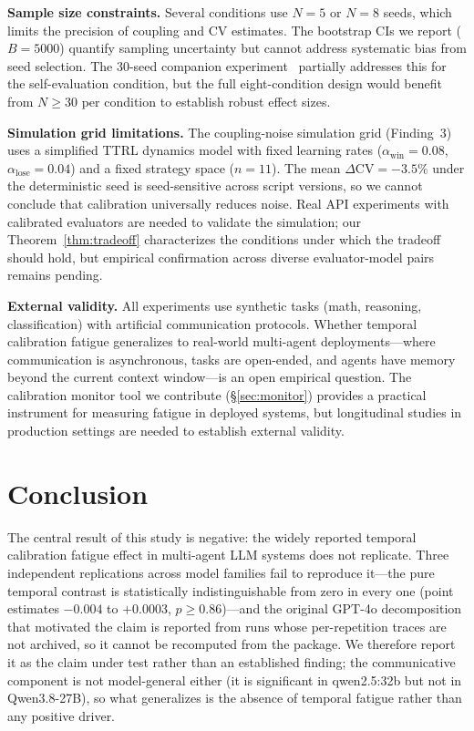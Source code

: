 \documentclass[11pt]{article}
\newcommand{\CV}{\ensuremath{\mathrm{CV}}}
\theoremstyle{definition}
\theoremstyle{remark}
\begin{document}
\textbf{Sample size constraints.} Several conditions use $N{=}5$ or $N{=}8$ seeds, which limits the precision of coupling and CV estimates. The bootstrap CIs we report ($B{=}5000$) quantify sampling uncertainty but cannot address systematic bias from seed selection. The 30-seed companion experiment~\citep{companion2026} partially addresses this for the self-evaluation condition, but the full eight-condition design would benefit from $N{\geq}30$ per condition to establish robust effect sizes.

\textbf{Simulation grid limitations.} The coupling-noise simulation grid (Finding~3) uses a simplified TTRL dynamics model with fixed learning rates ($\alpha_{\text{win}}{=}0.08$, $\alpha_{\text{lose}}{=}0.04$) and a fixed strategy space ($n{=}11$). The mean $\Delta\CV{=}-3.5\%$ under the deterministic seed is seed-sensitive across script versions, so we cannot conclude that calibration universally reduces noise. Real API experiments with calibrated evaluators are needed to validate the simulation; our Theorem~\ref{thm:tradeoff} characterizes the conditions under which the tradeoff should hold, but empirical confirmation across diverse evaluator-model pairs remains pending.

\textbf{External validity.} All experiments use synthetic tasks (math, reasoning, classification) with artificial communication protocols. Whether temporal calibration fatigue generalizes to real-world multi-agent deployments---where communication is asynchronous, tasks are open-ended, and agents have memory beyond the current context window---is an open empirical question. The calibration monitor tool we contribute (\S\ref{sec:monitor}) provides a practical instrument for measuring fatigue in deployed systems, but longitudinal studies in production settings are needed to establish external validity.

\section{Conclusion}

The central result of this study is negative: the widely reported temporal calibration fatigue effect in multi-agent LLM systems does not replicate. Three independent replications across model families fail to reproduce it---the pure temporal contrast is statistically indistinguishable from zero in every one (point estimates $-0.004$ to $+0.0003$, $p \geq 0.86$)---and the original GPT-4o decomposition that motivated the claim is reported from runs whose per-repetition traces are not archived, so it cannot be recomputed from the package. We therefore report it as the claim under test rather than an established finding; the communicative component is not model-general either (it is significant in qwen2.5:32b but not in Qwen3.8-27B), so what generalizes is the absence of temporal fatigue rather than any positive driver.
\end{document}
